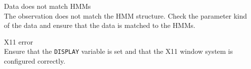 \begin{itemize}
\begin{itemize}
    Data does not match HMMs\\
        The observation does not match the HMM structure.  Check the parameter
        kind of the data and ensure that the data is matched to the HMMs.

\end{itemize}


\begin{itemize}
    X11 error\\
        Ensure that the \texttt{DISPLAY} variable is set and that the
        X11 window system is configured correctly.

\end{itemize}

\end{itemize}


